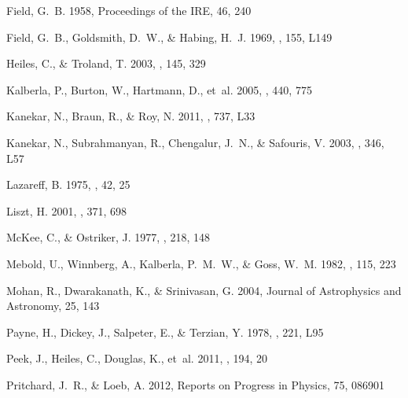 \documentclass{aastex}
\begin{document}
\begin{thebibliography}{}
{Field}, G.~B. 1958, Proceedings of the IRE, 46, 240

{Field}, G.~B., {Goldsmith}, D.~W., \& {Habing}, H.~J. 1969, \apjl, 155, L149

{Heiles}, C., \& {Troland}, T. 2003, \apjs, 145, 329

{Kalberla}, P., {Burton}, W., {Hartmann}, D., {et~al.} 2005, \aap, 440, 775

{Kanekar}, N., {Braun}, R., \& {Roy}, N. 2011, \apjl, 737, L33

{Kanekar}, N., {Subrahmanyan}, R., {Chengalur}, J.~N., \& {Safouris}, V. 2003,
  \mnras, 346, L57

{Lazareff}, B. 1975, \aap, 42, 25

{Liszt}, H. 2001, \aap, 371, 698

{McKee}, C., \& {Ostriker}, J. 1977, \apj, 218, 148

{Mebold}, U., {Winnberg}, A., {Kalberla}, P.~M.~W., \& {Goss}, W.~M. 1982,
  \aap, 115, 223

{Mohan}, R., {Dwarakanath}, K., \& {Srinivasan}, G. 2004, Journal of
  Astrophysics and Astronomy, 25, 143

{Payne}, H., {Dickey}, J., {Salpeter}, E., \& {Terzian}, Y. 1978, \apjl, 221,
  L95

{Peek}, J., {Heiles}, C., {Douglas}, K., {et~al.} 2011, \apjs, 194, 20

{Pritchard}, J.~R., \& {Loeb}, A. 2012, Reports on Progress in Physics, 75,
  086901


\end{thebibliography}
\end{document}
